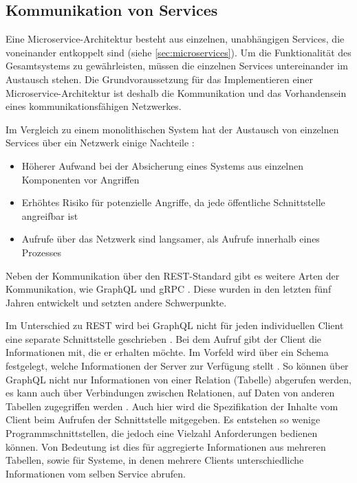 \subsection{Kommunikation von Services}
\label{sec:kommunikation}

Eine Microservice-Architektur besteht aus einzelnen, unabhängigen Services, die voneinander entkoppelt sind (siehe \cref{sec:microservices}). Um die Funktionalität des Gesamtsystems zu gewährleisten, müssen die einzelnen Services untereinander im Austausch stehen. Die Grundvoraussetzung für das Implementieren einer Microservice-Architektur ist deshalb die Kommunikation und das Vorhandensein eines kommunikationsfähigen Netzwerkes.

Im Vergleich zu einem monolithischen System hat der Austausch von einzelnen Services über ein Netzwerk einige Nachteile \parencite[vgl.][Kap. 6.1]{wolff_microservices_2018}:
\begin{itemize}
	\item Höherer Aufwand bei der Absicherung eines Systems aus einzelnen Komponenten vor Angriffen
	\item Erhöhtes Risiko für potenzielle Angriffe, da jede öffentliche Schnittstelle angreifbar ist
	\item Aufrufe über das Netzwerk sind langsamer, als Aufrufe innerhalb eines Prozesses
\end{itemize}

Neben der Kommunikation über den REST-Standard gibt es weitere Arten der Kommunikation, wie GraphQL \parencite{graphql_docs} und gRPC \parencite{grpc_docs}. Diese wurden in den letzten fünf Jahren entwickelt und setzten andere Schwerpunkte.

Im Unterschied zu REST wird bei GraphQL nicht für jeden individuellen Client eine separate Schnittstelle geschrieben \parencite[vgl.][]{graphql_docs}. Bei dem Aufruf gibt der Client die Informationen mit, die er erhalten möchte. Im Vorfeld wird über ein Schema festgelegt, welche Informationen der Server zur Verfügung stellt \parencite[vgl.][]{graphql_docs}. So können über GraphQL nicht nur Informationen von einer Relation (Tabelle) abgerufen werden, es kann auch über Verbindungen zwischen Relationen, auf Daten von anderen Tabellen zugegriffen werden \parencite[vgl.][]{graphql_docs}. Auch hier wird die Spezifikation der Inhalte vom Client beim Aufrufen der Schnittstelle mitgegeben. Es entstehen so wenige Programmschnittstellen, die jedoch eine Vielzahl Anforderungen bedienen können. Von Bedeutung ist dies für aggregierte Informationen aus mehreren Tabellen, sowie für Systeme, in denen mehrere Clients unterschiedliche Informationen vom selben Service abrufen.

